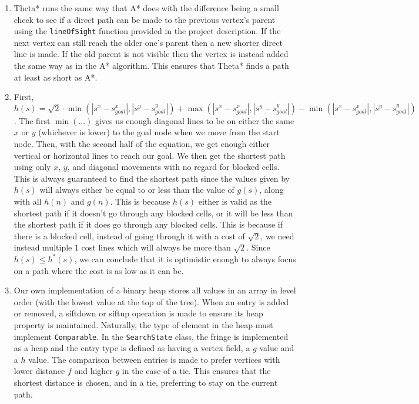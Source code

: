 \documentclass[12pt]{article}
\begin{document}
\begin{enumerate}[label={\large\textbf{\alph*)}}]
\item
Theta* runs the same way that A* does with the difference being a small check to see
if a direct path can be made to the previous vertex's parent using the \verb|lineOfSight| function provided
in the project description. If the next vertex can still reach the older one's parent then a new shorter
direct line is made. If the old parent is not visible then the vertex is instead added the same way as
in the A* algorithm. This ensures that Theta* finds a path at least as short as A*.

\item
First, $h(s) = \sqrt{2} \cdot
  \min(|s^x - s_{goal}^x|, |s^y - s_{goal}^y|)
+ \max(|s^x - s_{goal}^x|, |s^y - s_{goal}^y|)
- \min(|s^x - s_{goal}^x|, |s^y - s_{goal}^y|)$.
The first $\min(...)$ gives us enough diagonal lines to be on either the same $x$ or $y$ (whichever is lower)
to the goal node when we move from the start node. Then, with the second half of the equation,
we get enough either vertical or horizontal lines to reach our goal.
We then get the shortest path using only $x$, $y$, and diagonal movements with no regard for blocked cells.
This is always guaranteed to find the shortest path since the values given by $h(s)$
will always either be equal to or less than the value of $g(s)$, along with all $h(n)$ and $g(n)$.
This is because $h(s)$ either is valid as the shortest path if it doesn't go through any blocked cells,
or it will be less than the shortest path if it does go through any blocked cells.
This is because if there is a blocked cell, instead of going through it with a cost of $\sqrt{2}$,
we need instead multiple 1 cost lines which will always be more than $\sqrt{2}$.
Since $h(s) \le h^*(s)$, we can conclude that it is optimistic enough to always focus on a path
where the cost is as low as it can be.

\item
Our own implementation of a binary heap stores all values in an array in level order
(with the lowest value at the top of the tree).
When an entry is added or removed, a siftdown or siftup operation is made to ensure its heap property is maintained.
Naturally, the type of element in the heap must implement \verb|Comparable|.
In the \verb|SearchState| class, the fringe is implemented as a heap
and the entry type is defined as having a vertex field, a $g$ value and a $h$ value.
The comparison between entries is made to prefer vertices with lower distance $f$ and higher $g$ in the case of a tie.
This ensures that the shortest distance is chosen, and in a tie, preferring to stay on the current path.


\end{enumerate}
\end{document}

